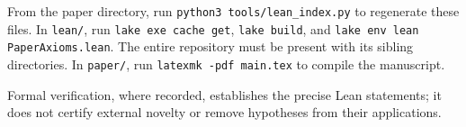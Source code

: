 From the paper directory, run \texttt{python3 tools/lean\_index.py} to regenerate
these files. In \texttt{lean/}, run \texttt{lake exe cache get}, \texttt{lake build},
and \texttt{lake env lean PaperAxioms.lean}. The entire repository must be present
with its sibling directories. In \texttt{paper/}, run
\texttt{latexmk -pdf main.tex} to compile the manuscript.

Formal verification, where recorded, establishes the precise Lean statements;
it does not certify external novelty or remove hypotheses from their applications.
